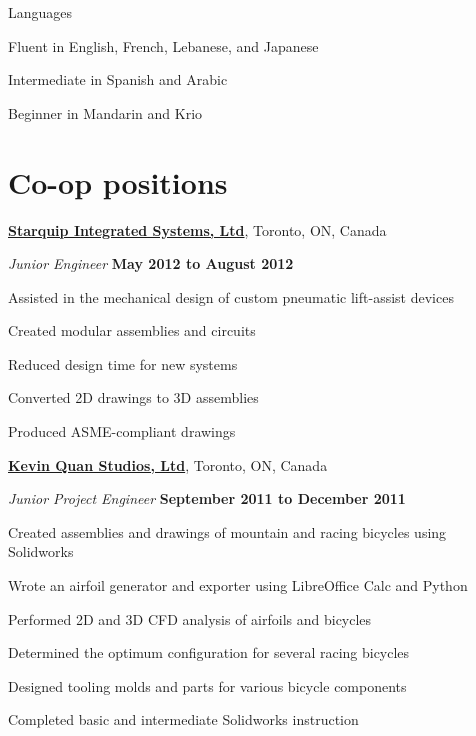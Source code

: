 \documentclass[10pt, a4paper]{article}
\begin{document}
\halfblankline

Languages
\begin{innerlist}
  \item Fluent in English, French, Lebanese, and Japanese
  \item Intermediate in Spanish and Arabic
  \item Beginner in Mandarin and Krio
\end{innerlist}

\section{Co-op positions}

\href{http://starquip.com/}{\textbf{Starquip Integrated Systems, Ltd}}, Toronto, ON, Canada

\begin{outerlist}
\item[] \textit{Junior Engineer} \hfill \textbf{May 2012 to August 2012}
\begin{innerlist}
  \item Assisted in the mechanical design of custom pneumatic lift-assist devices
  \item Created modular assemblies and circuits
  \item Reduced design time for new systems
  \item Converted 2D drawings to 3D assemblies
  \item Produced ASME-compliant drawings
\end{innerlist}
\end{outerlist}

\halfblankline

\href{http://www.kqbikes.com/}{\textbf{Kevin Quan Studios, Ltd}}, Toronto, ON, Canada

\begin{outerlist}
\item[] \textit{Junior Project Engineer} \hfill \textbf{September 2011 to December 2011}
\begin{innerlist}
  \item Created assemblies and drawings of mountain and racing bicycles using Solidworks
  \item Wrote an airfoil generator and exporter using LibreOffice Calc and Python
  \item Performed 2D and 3D CFD analysis of airfoils and bicycles
  \item Determined the optimum configuration for several racing bicycles
  \item Designed tooling molds and parts for various bicycle components
  \item Completed basic and intermediate Solidworks instruction
\end{innerlist}
\end{outerlist}
\end{document}
